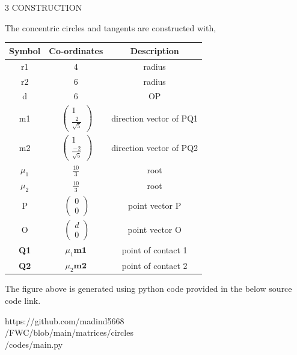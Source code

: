 \documentclass[a4paper,10pt]{report}
\let\vec\mathbf
\begin{document}
\begin{multicols}{2}
\vspace{2mm}\\
\vspace{2mm}\\
\centering \large\textsc{3  C}\footnotesize\textsc{ONSTRUCTION}\vspace{5mm}\\
\raggedright\large{The concentric circles and tangents are constructed with,} 
\begin{center}
    \label{tab:truthtable}
    \setlength{\arrayrulewidth}{0.2mm}
\setlength{\tabcolsep}{5pt}
\renewcommand{\arraystretch}{1.25}
    \begin{tabular}{|c|c|c|}
    \hline %
      \large\textbf{Symbol} & \large\textbf{Co-ordinates} & \large\textbf{Description}\\
      \hline
       \large r1& 4& \large{radius}\\
       \large r2& 6& \large{radius}\\
       \large d & 6 & OP\\
	\large m1 & $\ \begin{pmatrix} 1\\\frac{2}{\sqrt{5}} \end{pmatrix}$ & \large direction vector of PQ1\\
	\large m2 & $\ \begin{pmatrix} 1\\\frac{-2}{\sqrt{5}} \end{pmatrix}$ & \large direction vector of PQ2\\
        \large$ \mu_1$ & $\frac{10}{3}$ & \large{root}\\
	\large $\mu_2$ & $\frac{10}{3}$ & \large{root}\\
        \large P & $\ \begin{pmatrix} 0\\0 \end{pmatrix}$ & \large point vector P\\
	\large O & $\ \begin{pmatrix} d\\0 \end{pmatrix}$ & \large point vector O\\
	\large \textbf{Q1} & $\mu_1\vec{m1}$ & point of contact 1\\
	\large \textbf{Q2} & $\mu_2\vec{m2}$ & point of contact 2\\
      \hline
   \end{tabular}
 \end{center}\vspace{5mm}
\raggedright\large{The figure above is generated using python code provided in the below source code link.}\vspace{2mm}\\
\begin{mdframed}
\raggedright\large{https://github.com/madind5668 \\ /FWC/blob/main/matrices/circles \\ /codes/main.py}
\end{mdframed}
\end{multicols}
\end{document}
